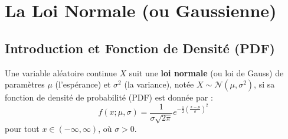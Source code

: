 \newpage
\section{La Loi Normale (ou Gaussienne)}

\subsection{Introduction et Fonction de Densité (PDF)}

\begin{definitionbox}
Une variable aléatoire continue $X$ suit une \textbf{loi normale} (ou loi de Gauss) de paramètres $\mu$ (l'espérance) et $\sigma^2$ (la variance), notée $X \sim \mathcal{N}(\mu, \sigma^2)$, si sa fonction de densité de probabilité (PDF) est donnée par :
$$ f(x; \mu, \sigma) = \frac{1}{\sigma \sqrt{2\pi}} e^{ -\frac{1}{2} \left( \frac{x-\mu}{\sigma} \right)^2 } $$
pour tout $x \in (-\infty, \infty)$, où $\sigma > 0$.
\end{definitionbox}

